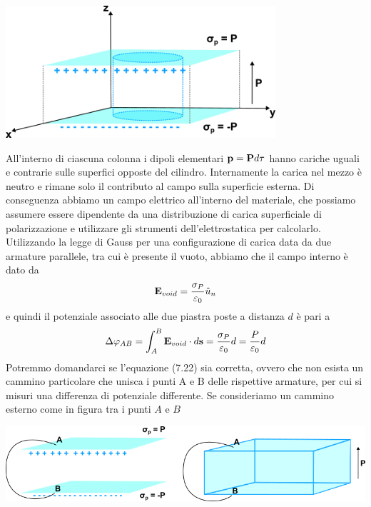 \begin{center}
	\includegraphics[width = 10cm]{images/distpol}
\end{center}
All'interno  di ciascuna colonna i dipoli elementari $ \bold{p} = \bold{P} d\tau$ hanno cariche uguali e contrarie sulle superfici opposte del cilindro. Internamente la carica nel  mezzo \`e neutro e rimane solo il contributo al campo sulla superficie esterna. Di conseguenza abbiamo un campo elettrico all'interno del materiale, che possiamo assumere essere dipendente da una distribuzione di carica superficiale di polarizzazione e utilizzare gli strumenti dell'elettrostatica per calcolarlo. Utilizzando la legge di Gauss per una configurazione di carica data da due armature parallele, tra cui \`e presente il vuoto,  abbiamo che il campo interno \`e dato da
\begin{equation*}
	\bold{E}_{void} = \frac{\sigma_{P}}{\varepsilon_0} \hat{u}_{n}
\end{equation*}
e quindi il potenziale associato alle due piastra poste a distanza $d$ \`e pari a 
\begin{equation}
	\Delta \varphi_{AB} = \int_{A}^{B} \bold{E}_{void} \cdot d\bold{s} = \frac{\sigma_{P}}{\varepsilon_0} d = \frac{P}{\varepsilon_0}d
\end{equation}
Potremmo domandarci se l'equazione (7.22) sia corretta, ovvero che  non esista un cammino particolare che unisca i punti A e B delle rispettive armature, per cui si misuri una differenza di potenziale differente. Se consideriamo un cammino esterno come in figura tra i punti $A$ e $B$
\begin{center}
	\includegraphics[width = 15cm]{images/dielpath}
\end{center}  

